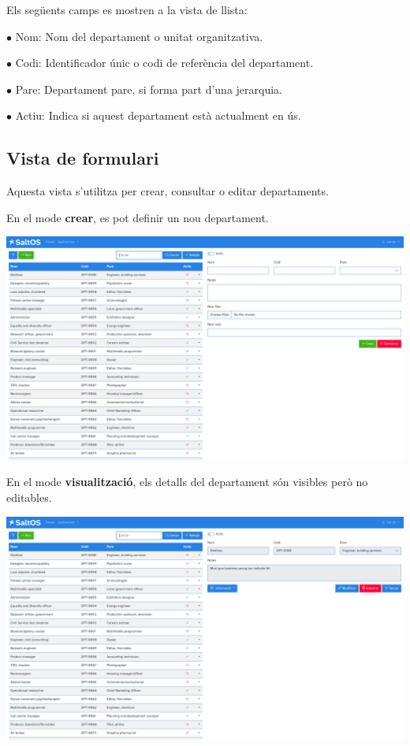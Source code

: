 \documentclass[a4paper]{article}
\begin{document}
Els següents camps es mostren a la vista de llista:

\begin{compactitem}
\item[\color{myblue}$\bullet$] Nom: Nom del departament o unitat organitzativa.
\item[\color{myblue}$\bullet$] Codi: Identificador únic o codi de referència del departament.
\item[\color{myblue}$\bullet$] Pare: Departament pare, si forma part d'una jerarquia.
\item[\color{myblue}$\bullet$] Actiu: Indica si aquest departament està actualment en ús.
\end{compactitem}

\hypertarget{toc104}{}
\subsection{Vista de formulari}

Aquesta vista s'utilitza per crear, consultar o editar departaments.

En el mode \textbf{crear}, es pot definir un nou departament.

\begin{center}\includegraphics[width=1\textwidth]{../ujest/snaps/test-screenshots-js-screenshots-hr-departments-create-ca-es-1-snap.png}\end{center}

En el mode \textbf{visualització}, els detalls del departament són visibles però no editables.

\begin{center}\includegraphics[width=1\textwidth]{../ujest/snaps/test-screenshots-js-screenshots-hr-departments-view-100-ca-es-1-snap.png}\end{center}
\end{document}

